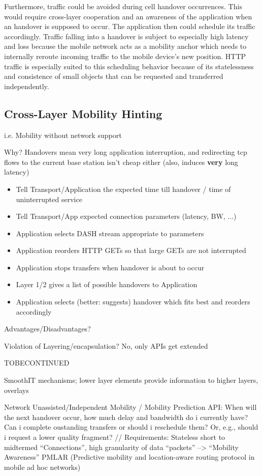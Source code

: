 Furthermore, traffic could be avoided during cell handover occurrences. This would require cross-layer cooperation and an awareness of the application when an handover is supposed to occur. The application then could schedule its traffic accordingly. Traffic falling into a handover is subject to especially high latency and loss because the mobile network acts as a mobility anchor which needs to internally reroute incoming traffic to the mobile device's new position. HTTP traffic is especially suited to this scheduling behavior because of its statelessness and consistence of small objects that can be requested and transferred independently.


\subsection{Cross-Layer Mobility Hinting}

i.e. Mobility without network support

Why? Handovers mean very long application interruption, and redirecting tcp flows to the current base station isn't cheap either (also, induces \textbf{very} long latency)

\begin{itemize}
\item Tell Transport/Application the expected time till handover / time of uninterrupted service
\item Tell Transport/App expected connection parameters (latency, BW, ...)
\item Application selects DASH stream appropriate to parameters
\item Application reorders HTTP GETs so that large GETs are not interrupted
\item Application stops transfers when handover is about to occur
\item Layer 1/2 gives a list of possible handovers to Application
\item Application selects (better: suggests) handover which fits best and reorders accordingly
\end{itemize}

Advantages/Disadvantages?

Violation of Layering/encapsulation? No, only APIs get extended 

TOBECONTINUED

SmoothIT mechanisms; lower layer elements provide information to higher layers, overlays  \cite{oechsner2009pushing}


Network Unassisted/Independent Mobility / Mobility Prediction API: When will the next handover occur, how much delay and bandwidth do i currently have? Can i complete oustanding transfers or should i reschedule them? Or, e.g., should i request a lower quality fragment? // Requirements: Stateless short to midtermed ``Connections'', high granularity of data ``packets''
--> ``Mobility Awareness'' \cite{hummel2010mobilitaet} PMLAR (Predictive mobility and location-aware routing protocol in mobile ad hoc networks)





